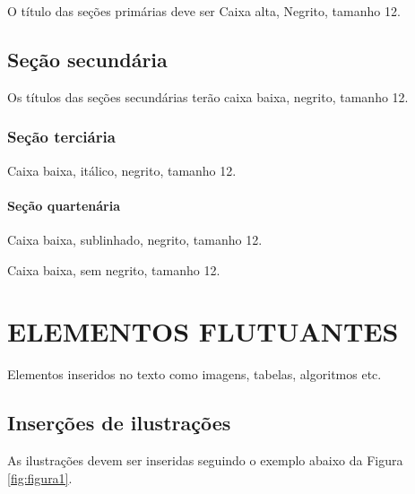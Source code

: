 O título das seções primárias deve ser  Caixa alta, Negrito, tamanho 12.

\section{\hspace{-0.3cm}Seção secundária}

Os títulos das seções secundárias terão caixa baixa, negrito, tamanho 12.

\subsection{\hspace{-0.3cm}Seção terciária}

Caixa baixa, itálico, negrito, tamanho 12.

\subsubsection{\hspace{-0.3cm}Seção quartenária}
 
 Caixa baixa, sublinhado, negrito, tamanho 12.
 
\vspace{0.5cm} 
\vspace{0.5cm}

 Caixa baixa, sem negrito, tamanho 12.

  
 \chapter{\uppercase{Elementos flutuantes}}


Elementos inseridos no texto como imagens, tabelas, algoritmos etc.


\section{\hspace{-0.3cm}Inserções de ilustrações}

As ilustrações devem ser inseridas seguindo o exemplo abaixo da Figura \ref{fig:figura1}. 


